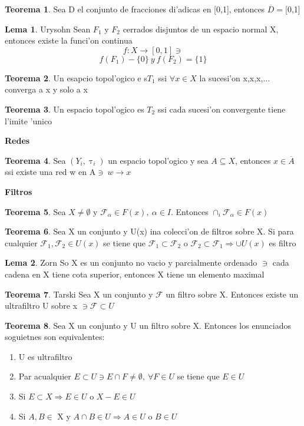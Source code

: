 \documentclass{article}
\theoremstyle{definition}
\newtheorem{theorem}{Teorema}
\newtheorem{lemma}{Lema}
\begin{document}
\begin{theorem}
	Sea D el conjunto de fracciones di'adicas en [0,1], entonces $\overline{D}=$[0,1]
\end{theorem}
\begin{lemma}{Urysohn}
	Sean $F_1$ y $F_2$ cerrados disjuntos de un espacio normal X, entonces existe la funci'on continua 
	\[f:X\to[0,1]\ni\]
	\[f(F_1)-\{0\}\ y \ f(F_2)=\{1\}\]
\end{lemma}
\begin{theorem}
	Un esapcio topol'ogico e s$T_1$ ssi $\forall x\in X$ la sucesi'on x,x,x,... converga a x y solo a x
\end{theorem}
\begin{theorem}
	Un espacio topol'ogico es $T_2$ ssi cada sucesi'on convergente tiene l'imite 'unico
\end{theorem}
\textbf{Redes}
\begin{theorem}
	Sea $(Y_i,\uptau_i)$ un espacio topol'ogico y sea $A\subseteq X$, entonces $x\in \overline{A}$ ssi existe una red w en A$\ni\ w\to x$
\end{theorem}
\textbf{Filtros}
\begin{theorem}
	Sea $X\neq\emptyset$ y $\mathcal{F}_{\alpha}\in F(x),\ \alpha\in I$. Entonces $\cap_i\mathcal{F}_{\alpha}\in F(x)$
\end{theorem}
\begin{theorem}
	Sea X un conjunto y U(x) ina colecci'on de filtros sobre X. Si para cualquier $\mathcal{F}_1,\mathcal{F}_2\in U(x)$ se tiene que $\mathcal{F}_1\subset\mathcal{F}_2$ o $\mathcal{F}_2\subset\mathcal{F}_1\Rightarrow \cup U(x)$ es filtro
\end{theorem}
\begin{lemma}{Zorn}
	So X es un conjunto no vacio y parcialmente ordenado $\ni$ cada cadena en X tiene cota superior, entonces X tiene un elemento maximal
\end{lemma}
\begin{theorem}{Tarski}
	Sea X un conjunto y $\mathcal{F}$ un filtro sobre X. Entonces existe un ultrafiltro U sobre x $\ni \mathcal{F}\subset U$
\end{theorem}
\begin{theorem}
	Sea X un conjunto y U un filtro sobre X. Entonces los enunciados soguietnes son equivalentes:
	\begin{enumerate}
		\item U es ultrafiltro
		\item Par acualquier $E\subset U\ni E\cap F\neq \emptyset,\ \forall F\in U$ se tiene que $E\in U$
		\item Si $E\subset X\Rightarrow E\in U$ o $X-E\in U$
		\item Si $A, B\in$ X y $ A\cap B\in U\Rightarrow A\in U$ o $ B\in U$
	\end{enumerate}
\end{theorem}
\end{document}
